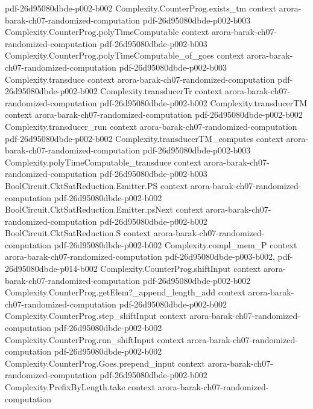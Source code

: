 \begin{theorem}
  {pdf-26d95080dbde-p002-b002}
\proofstep
  {Complexity.CounterProg.exists_tm}
  {context}
  {arora-barak-ch07-randomized-computation}
  {pdf-26d95080dbde-p002-b003}
\proofstep
  {Complexity.CounterProg.polyTimeComputable}
  {context}
  {arora-barak-ch07-randomized-computation}
  {pdf-26d95080dbde-p002-b003}
\proofstep
  {Complexity.CounterProg.polyTimeComputable_of_goes}
  {context}
  {arora-barak-ch07-randomized-computation}
  {pdf-26d95080dbde-p002-b003}
\proofstep
  {Complexity.transduce}
  {context}
  {arora-barak-ch07-randomized-computation}
  {pdf-26d95080dbde-p002-b002}
\proofstep
  {Complexity.transducerTr}
  {context}
  {arora-barak-ch07-randomized-computation}
  {pdf-26d95080dbde-p002-b002}
\proofstep
  {Complexity.transducerTM}
  {context}
  {arora-barak-ch07-randomized-computation}
  {pdf-26d95080dbde-p002-b002}
\proofstep
  {Complexity.transducer_run}
  {context}
  {arora-barak-ch07-randomized-computation}
  {pdf-26d95080dbde-p002-b002}
\proofstep
  {Complexity.transducerTM_computes}
  {context}
  {arora-barak-ch07-randomized-computation}
  {pdf-26d95080dbde-p002-b003}
\proofstep
  {Complexity.polyTimeComputable_transduce}
  {context}
  {arora-barak-ch07-randomized-computation}
  {pdf-26d95080dbde-p002-b003}
\proofstep
  {BoolCircuit.CktSatReduction.Emitter.PS}
  {context}
  {arora-barak-ch07-randomized-computation}
  {pdf-26d95080dbde-p002-b002}
\proofstep
  {BoolCircuit.CktSatReduction.Emitter.psNext}
  {context}
  {arora-barak-ch07-randomized-computation}
  {pdf-26d95080dbde-p002-b002}
\proofstep
  {BoolCircuit.CktSatReduction.S}
  {context}
  {arora-barak-ch07-randomized-computation}
  {pdf-26d95080dbde-p002-b002}
\proofstep
  {Complexity.compl_mem_P}
  {context}
  {arora-barak-ch07-randomized-computation}
  {pdf-26d95080dbde-p003-b002,
    pdf-26d95080dbde-p014-b002}
\proofstep
  {Complexity.CounterProg.shiftInput}
  {context}
  {arora-barak-ch07-randomized-computation}
  {pdf-26d95080dbde-p002-b002}
\proofstep
  {Complexity.CounterProg.getElem?_append_length_add}
  {context}
  {arora-barak-ch07-randomized-computation}
  {pdf-26d95080dbde-p002-b002}
\proofstep
  {Complexity.CounterProg.step_shiftInput}
  {context}
  {arora-barak-ch07-randomized-computation}
  {pdf-26d95080dbde-p002-b002}
\proofstep
  {Complexity.CounterProg.run_shiftInput}
  {context}
  {arora-barak-ch07-randomized-computation}
  {pdf-26d95080dbde-p002-b002}
\proofstep
  {Complexity.CounterProg.Goes.prepend_input}
  {context}
  {arora-barak-ch07-randomized-computation}
  {pdf-26d95080dbde-p002-b002}
\proofstep
  {Complexity.PrefixByLength.take}
  {context}
  {arora-barak-ch07-randomized-computation}

\end{theorem}
